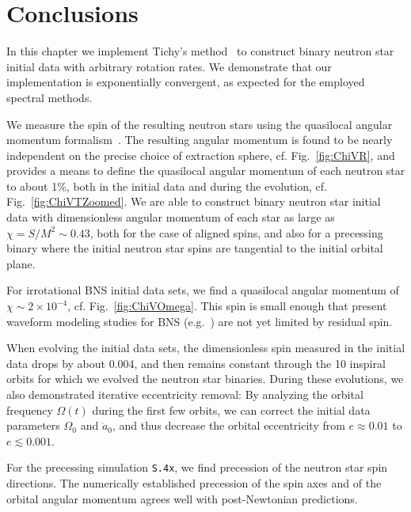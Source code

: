 \section{Conclusions}
\label{sec:Discussion}


In this chapter we implement Tichy's method~\citep{Tichy:2012rp} to
construct binary neutron star initial data with arbitrary rotation
rates. We demonstrate that our implementation is exponentially
convergent, as expected for the employed spectral methods.


We measure the spin of the resulting neutron stars using the
quasilocal angular momentum
formalism~\citep{BrownYork1993,Cook2007,Lovelace2008,OwenThesis}. The
resulting angular momentum is found to be nearly independent on the
precise choice of extraction sphere, cf. Fig.~\ref{fig:ChiVR}, and
provides a means to define the quasilocal angular momentum of each
neutron star to about 1\%, both in the initial data and during the
evolution, cf. Fig.~\ref{fig:ChiVTZoomed}. We are able to construct
binary neutron star initial data with dimensionless angular momentum
of each star as large as $\chi=S/M^2\sim 0.43$, both for the case of
aligned spins, and also for a precessing binary where the initial
neutron star spins are tangential to the initial orbital plane.

For irrotational BNS initial data sets, we find a quasilocal
  angular momentum of $\chi\sim 2\times 10^{-4}$,
  cf. Fig.~\ref{fig:ChiVOmega}. This spin is small enough that present
  waveform modeling studies for BNS
  (e.g.~\citep{Bernuzzi:2014owa,Baiotti2011,Baiotti:2010xh}) are not
  yet limited by residual spin.



When evolving the initial data sets, the dimensionless spin measured
in the initial data drops by about 0.004, and then remains constant
through the 10 inspiral orbits for which we evolved the neutron star
binaries. During these evolutions, we also demonstrated iterative
eccentricity removal: By analyzing the orbital frequency $\Omega(t)$
during the first few orbits, we can correct the initial data
parameters $\Omega_0$ and $\dot a_0$, and thus decrease the orbital
eccentricity from $e\approx 0.01$ to $e\lesssim 0.001$.



For the precessing simulation {\tt S.4x}, we find precession of the neutron
star spin directions. The numerically established precession of the
spin axes and of the orbital angular momentum agrees well with
post-Newtonian predictions.


